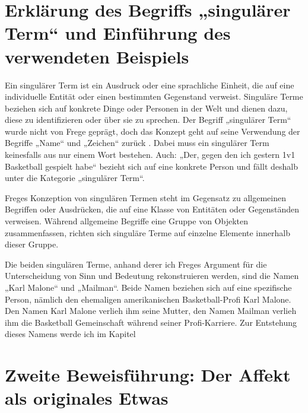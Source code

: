 \documentclass[ngerman,12pt]{diazessay} %
\begin{document}
\begin{doublespace}

\section{Erklärung des Begriffs „singulärer Term“ und Einführung des verwendeten Beispiels}
Ein singulärer Term ist ein Ausdruck oder eine sprachliche Einheit, die auf eine individuelle Entität oder einen bestimmten Gegenstand verweist. Singuläre Terme beziehen sich auf konkrete Dinge oder Personen in der Welt und dienen dazu, diese zu identifizieren oder über sie zu sprechen. Der Begriff „singulärer Term“ wurde nicht von Frege geprägt, doch das Konzept geht auf seine Verwendung der Begriffe „Name“ und „Zeichen“ zurück \cite[siehe S.26]{Frege}. Dabei muss ein singulärer Term keinesfalls aus nur einem Wort bestehen. Auch: „Der, gegen den ich gestern 1v1 Basketball gespielt habe“ bezieht sich auf eine konkrete Person und fällt deshalb unter die Kategorie „singulärer Term“.

Freges Konzeption von singulären Termen steht im Gegensatz zu allgemeinen Begriffen oder Ausdrücken, die auf eine Klasse von Entitäten oder Gegenständen verweisen. Während allgemeine Begriffe eine Gruppe von Objekten zusammenfassen, richten sich singuläre Terme auf einzelne Elemente innerhalb dieser Gruppe.

Die beiden singulären Terme, anhand derer ich Freges Argument für die Unterscheidung von Sinn und Bedeutung rekonstruieren werden, sind die Namen „Karl Malone“ und „Mailman“. Beide Namen beziehen sich auf eine spezifische Person, nämlich den ehemaligen amerikanischen Basketball-Profi Karl Malone. Den Namen Karl Malone verlieh ihm seine Mutter, den Namen Mailman verlieh ihm die Basketball Gemeinschaft während seiner Profi-Karriere. Zur Entstehung dieses Namens werde ich im Kapitel

\section{Zweite Beweisführung: Der Affekt als originales Etwas}


\end{doublespace}
\end{document}
